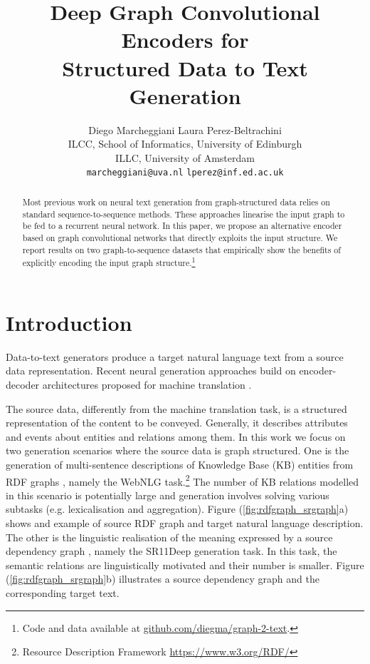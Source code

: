 \documentclass[11pt,a4paper,dvipsnames]{article}
\title{Deep Graph Convolutional Encoders for \\Structured Data to Text Generation}
\author{
 Diego Marcheggiani \hspace{1cm} Laura Perez-Beltrachini\\
 ILCC, School of Informatics, University of Edinburgh \\
 ILLC,  University of Amsterdam  \\
    {\tt marcheggiani@uva.nl} \hspace{0.3cm} {\tt {lperez}@inf.ed.ac.uk} 
 }
\date{}
\begin{document}
\maketitle
\begin{abstract}
Most previous work on neural text generation from graph-structured 
data relies on standard sequence-to-sequence methods. These approaches
linearise the input graph to be fed to a recurrent neural network.
In this paper, we propose an alternative encoder based on graph 
convolutional networks that directly exploits the input structure.
We report results on two graph-to-sequence datasets that empirically 
show the benefits of explicitly encoding the input graph structure.\footnote{Code and data available at \url{github.com/diegma/graph-2-text}.}

\end{abstract}


 

\section{Introduction}

Data-to-text generators produce a target natural language text 
from a source data representation. Recent neural generation approaches 
\cite{mei2015talk,lebret-grangier-auli:2016:EMNLP2016,wiseman-shieber-rush:2017:EMNLP2017,gardent-EtAl:2017:INLG2017,ferreira2017linguistic,konstas2017neural} 
build on encoder-decoder architectures proposed for machine translation
\cite{sutskever2014sequence,bahdanau2015neural}.


The source data, differently from the machine translation task, 
is a structured representation of the content to be conveyed.
Generally, it describes attributes and events about entities and relations among them.
In this work we focus on two generation scenarios where the source
data is graph structured.
One is the generation of multi-sentence descriptions
of Knowledge Base (KB) entities from RDF graphs
\cite{perezbeltrachini-sayed-gardent:2016:COLING,gardent-EtAl:2017:Long,gardent-EtAl:2017:INLG2017},
namely the WebNLG task.\footnote{Resource Description Framework \url{https://www.w3.org/RDF/}}
The number of KB relations modelled in this scenario is potentially large and generation involves 
solving various subtasks (e.g. lexicalisation and 
aggregation). Figure (\ref{fig:rdfgraph_srgraph}a) shows and example 
of source RDF graph and target natural language description.
The other is the linguistic realisation of the meaning expressed 
by a source dependency graph \cite{belz2011first}, namely the SR11Deep generation task. 
In this task, the semantic relations are linguistically motivated and their number 
is smaller.
Figure (\ref{fig:rdfgraph_srgraph}b) illustrates a source dependency graph 
and the corresponding target text.
\end{document}
